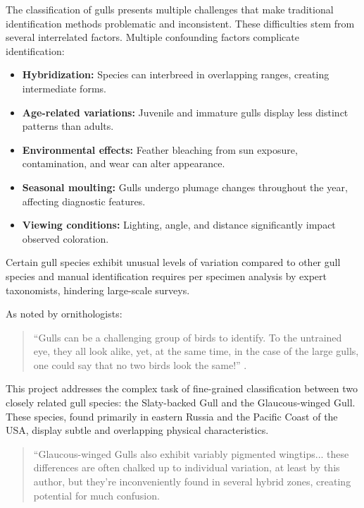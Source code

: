 \documentclass[a4paper,12pt]{article}
\begin{document}
The classification of gulls presents multiple challenges that make traditional identification methods problematic and inconsistent. These difficulties stem from several interrelated factors. 
Multiple confounding factors complicate identification:
\begin{itemize}
    \item \textbf{Hybridization:} Species can interbreed in overlapping ranges, creating intermediate forms.
    \item \textbf{Age-related variations:} Juvenile and immature gulls display less distinct patterns than adults.
    \item \textbf{Environmental effects:} Feather bleaching from sun exposure, contamination, and wear can alter appearance.
    \item \textbf{Seasonal moulting:} Gulls undergo plumage changes throughout the year, affecting diagnostic features.
    \item \textbf{Viewing conditions:} Lighting, angle, and distance significantly impact observed coloration.
\end{itemize} \citep{adriaens2022}

Certain gull species exhibit unusual levels of variation compared to other gull species and manual identification requires per specimen analysis by expert taxonomists, hindering large-scale surveys.

As noted by ornithologists:

\begin{quote}
    ``Gulls can be a challenging group of birds to identify. To the untrained eye, they all look alike, yet, at the same time, in the case of the large gulls, one could say that no two birds look the same!'' \citep{ayyash2024}.
\end{quote}



This project addresses the complex task of fine-grained classification between two closely related gull species: the Slaty-backed Gull and the Glaucous-winged Gull. These species, found primarily in eastern Russia and the Pacific Coast of the USA, display subtle and overlapping physical characteristics. 

\begin{quote}
    ``Glaucous-winged Gulls also exhibit variably pigmented wingtips... these differences are often chalked up to individual
    variation, at least by this author, but they're inconveniently found in several hybrid zones, creating potential for much
    confusion.\citep{adriaens2022}
    \end{quote}
    
\end{document}

